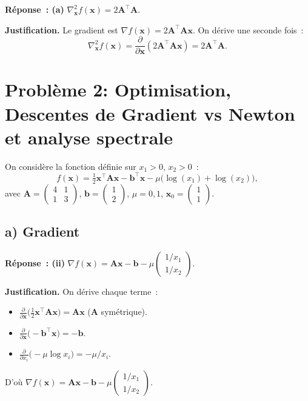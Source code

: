 \documentclass[12pt,letterpaper]{article}
\begin{document}
\textbf{Réponse~: (a)} $\nabla^2_{\mathbf{x}} f(\mathbf{x}) = 2\mathbf{A}^\top\mathbf{A}$.

\textbf{Justification.}
Le gradient est $\nabla f(\mathbf{x}) = 2\mathbf{A}^\top\mathbf{A}\mathbf{x}$. On dérive une seconde fois~:
\[
\nabla^2_{\mathbf{x}} f(\mathbf{x}) = \frac{\partial}{\partial \mathbf{x}}(2\mathbf{A}^\top\mathbf{A}\mathbf{x}) = \boxed{2\mathbf{A}^\top\mathbf{A}}.
\]

\section{Problème 2: Optimisation, Descentes de Gradient vs Newton et analyse spectrale}

On considère la fonction définie sur $x_1 > 0$, $x_2 > 0$~:
\[
f(\mathbf{x}) = \tfrac{1}{2}\mathbf{x}^\top\mathbf{A}\mathbf{x} - \mathbf{b}^\top\mathbf{x} - \mu\bigl(\log(x_1) + \log(x_2)\bigr),
\]
avec
$\mathbf{A} = \begin{pmatrix} 4 & 1 \\ 1 & 3 \end{pmatrix}$,
$\mathbf{b} = \begin{pmatrix} 1 \\ 2 \end{pmatrix}$,
$\mu = 0{,}1$,
$\mathbf{x}_0 = \begin{pmatrix} 1 \\ 1 \end{pmatrix}$.

\subsection{a) Gradient} %

\textbf{Réponse~: (ii)} $\displaystyle \nabla f(\mathbf{x}) = \mathbf{A}\mathbf{x} - \mathbf{b} - \mu\begin{pmatrix} 1/x_1 \\ 1/x_2 \end{pmatrix}$.

\textbf{Justification.}
On dérive chaque terme~:
\begin{itemize}
  \item $\frac{\partial}{\partial \mathbf{x}}\bigl(\tfrac{1}{2}\mathbf{x}^\top\mathbf{A}\mathbf{x}\bigr) = \mathbf{A}\mathbf{x}$ ($\mathbf{A}$ symétrique).
  \item $\frac{\partial}{\partial \mathbf{x}}\bigl(-\mathbf{b}^\top\mathbf{x}\bigr) = -\mathbf{b}$.
  \item $\frac{\partial}{\partial x_i}\bigl(-\mu\log x_i\bigr) = -\mu/x_i$.
\end{itemize}
D'où $\nabla f(\mathbf{x}) = \boxed{\mathbf{A}\mathbf{x} - \mathbf{b} - \mu\begin{pmatrix} 1/x_1 \\ 1/x_2 \end{pmatrix}}$.
\end{document}
